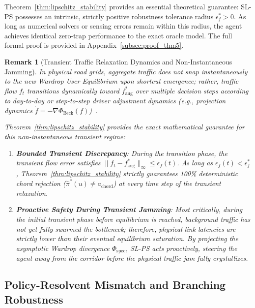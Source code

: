 \documentclass[11pt,a4paper]{article}
\newtheorem{remark}{Remark}
\begin{document}
Theorem~\ref{thm:lipschitz_stability} provides an essential theoretical guarantee: SL-PS possesses an intrinsic, strictly positive robustness tolerance radius $\epsilon_f^* > 0$. As long as numerical solvers or sensing errors remain within this radius, the agent achieves identical zero-trap performance to the exact oracle model. The full formal proof is provided in Appendix~\ref{subsec:proof_thm5}.

\begin{remark}[Transient Traffic Relaxation Dynamics and Non-Instantaneous Jamming]
\label{rem:transient_relaxation}
In physical road grids, aggregate traffic does not snap instantaneously to the new Wardrop User Equilibrium upon shortcut emergence; rather, traffic flow $f_t$ transitions dynamically toward $f_{\text{aug}}^*$ over multiple decision steps according to day-to-day or step-to-step driver adjustment dynamics (e.g., projection dynamics $\dot{f} = -\nabla \Phi_{\text{Beck}}(f)$)~\cite{daganzo1977stochastic}. 

Theorem~\ref{thm:lipschitz_stability} provides the exact mathematical guarantee for this non-instantaneous transient regime:
\begin{enumerate}
    \item \textbf{Bounded Transient Discrepancy}: During the transition phase, the transient flow error satisfies $\|f_t - f_{\text{aug}}^*\|_\infty \le \epsilon_f(t)$. As long as $\epsilon_f(t) < \epsilon_f^*$, Theorem~\ref{thm:lipschitz_stability} strictly guarantees 100\% deterministic chord rejection ($\hat{\pi}^*(u) \ne a_{\text{chord}}$) at every time step of the transient relaxation.
    \item \textbf{Proactive Safety During Transient Jamming}: Most critically, during the initial transient phase before equilibrium is reached, background traffic has not yet fully swarmed the bottleneck; therefore, physical link latencies are strictly lower than their eventual equilibrium saturation. By projecting the asymptotic Wardrop divergence $\Phi_{\text{spec}}$, SL-PS acts \textit{proactively}, steering the agent away from the corridor \textit{before} the physical traffic jam fully crystallizes.
\end{enumerate}
\end{remark}

\subsection{Policy-Resolvent Mismatch and Branching Robustness}
\label{subsec:policy_mismatch}
\end{document}
